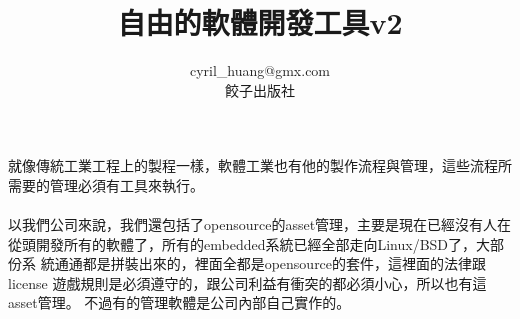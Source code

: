 \documentclass[a4paper,10pt,twoside]{book}
\title{自由的軟體開發工具v2}
\author{
  cyril\_huang@gmx.com\\
  餃子出版社
}
\begin{document}
  \maketitle
  \tableofcontents
  \newpage
  就像傳統工業工程上的製程一樣，軟體工業也有他的製作流程與管理，這些流程所
  需要的管理必須有工具來執行。
  \\\\
  以我們公司來說，我們還包括了opensource的asset管理，主要是現在已經沒有人在
  從頭開發所有的軟體了，所有的embedded系統已經全部走向Linux/BSD了，大部份系
  統通通都是拼裝出來的，裡面全都是opensource的套件，這裡面的法律跟license
  遊戲規則是必須遵守的，跟公司利益有衝突的都必須小心，所以也有這asset管理。
  不過有的管理軟體是公司內部自己實作的。
  
  
  
  
  
  
  
  
  
\end{document}
